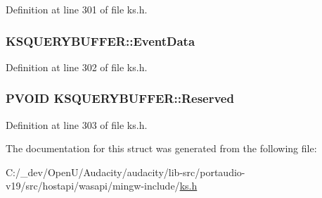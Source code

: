 Definition at line 301 of file ks.\+h.

\subsubsection[{\texorpdfstring{Event\+Data}{EventData}}]{ K\+S\+Q\+U\+E\+R\+Y\+B\+U\+F\+F\+E\+R\+::\+Event\+Data}\hypertarget{struct_k_s_q_u_e_r_y_b_u_f_f_e_r_a4426803e6409f14dd6c88d8ff118e21d}{}\label{struct_k_s_q_u_e_r_y_b_u_f_f_e_r_a4426803e6409f14dd6c88d8ff118e21d}


Definition at line 302 of file ks.\+h.

\subsubsection[{\texorpdfstring{Reserved}{Reserved}}]{\setlength{\rightskip}{0pt plus 5cm}P\+V\+O\+ID K\+S\+Q\+U\+E\+R\+Y\+B\+U\+F\+F\+E\+R\+::\+Reserved}\hypertarget{struct_k_s_q_u_e_r_y_b_u_f_f_e_r_aeca8dd5c0ecea824ec6a687d979f6c5f}{}\label{struct_k_s_q_u_e_r_y_b_u_f_f_e_r_aeca8dd5c0ecea824ec6a687d979f6c5f}


Definition at line 303 of file ks.\+h.



The documentation for this struct was generated from the following file\+:\begin{DoxyCompactItemize}
\item 
C\+:/\+\_\+dev/\+Open\+U/\+Audacity/audacity/lib-\/src/portaudio-\/v19/src/hostapi/wasapi/mingw-\/include/\hyperlink{ks_8h}{ks.\+h}\end{DoxyCompactItemize}
